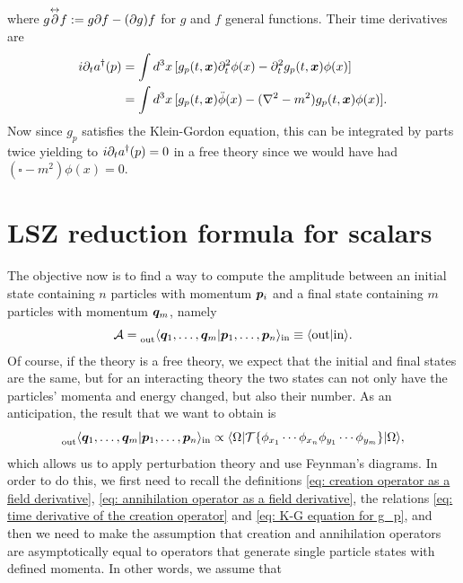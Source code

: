 where $g\overset{\leftrightarrow}{\partial} f := g\partial f - (\partial g)f$ for $g$ and $f$ general functions. Their time derivatives are 
\begin{equation}
\label{eq: time derivative of the creation operator}
    \begin{split}
        i\partial_ta^\dagger(p) &= \int d^3x\,[g_p(t,\bm{x})\partial_t^2\phi(x) - \partial_t^2g_p(t,\bm{x})\phi(x)] \\
        &= \int d^3x\,[g_p(t,\bm{x})\ddot{\phi}(x) - (\nabla^2 - m^2)g_p(t,\bm{x})\phi(x)].
    \end{split}
\end{equation}
Now since $g_p$ satisfies the Klein-Gordon equation, this can be integrated by parts twice yielding to $i\partial_ta^\dagger(p) = 0$ in a free theory since we would have had $(\square - m^2)\phi(x) = 0$.

\section{LSZ reduction formula for scalars}
The objective now is to find a way to compute the amplitude between an initial state containing $n$ particles with momentum $\bm{p}_i$ and a final state containing $m$ particles with momentum $\bm{q}_m$, namely
\begin{equation}
    \mathcal{A} = \prescript{}{\mathrm{out}}{\langle \bm{q}_1,\dots,\bm{q}_m | \bm{p}_1,\dots,\bm{p}_n \rangle}_{\mathrm{in}} \equiv \langle \mathrm{out} | \mathrm{in} \rangle.
\end{equation}
Of course, if the theory is a free theory, we expect that the initial and final states are the same, but for an interacting theory the two states can not only have the particles' momenta and energy changed, but also their number. As an anticipation, the result that we want to obtain is 
\begin{equation}
    \prescript{}{\mathrm{out}}{\langle \bm{q}_1,\dots,\bm{q}_m | \bm{p}_1,\dots,\bm{p}_n \rangle}_{\mathrm{in}} \propto \langle \Omega | \mathcal{T}{\{\phi_{x_1}\cdots\phi_{x_n}\phi_{y_1}\cdots\phi_{y_m}\}} | \Omega \rangle,
\end{equation}
which allows us to apply perturbation theory and use Feynman's diagrams. In order to do this, we first need to recall the definitions \eqref{eq: creation operator as a field derivative}, \eqref{eq: annihilation operator as a field derivative}, the relations \eqref{eq: time derivative of the creation operator} and \eqref{eq: K-G equation for g_p}, and then we need to make the assumption that creation and annihilation operators are asymptotically equal to operators that generate single particle states with defined momenta. In other words, we assume that 
